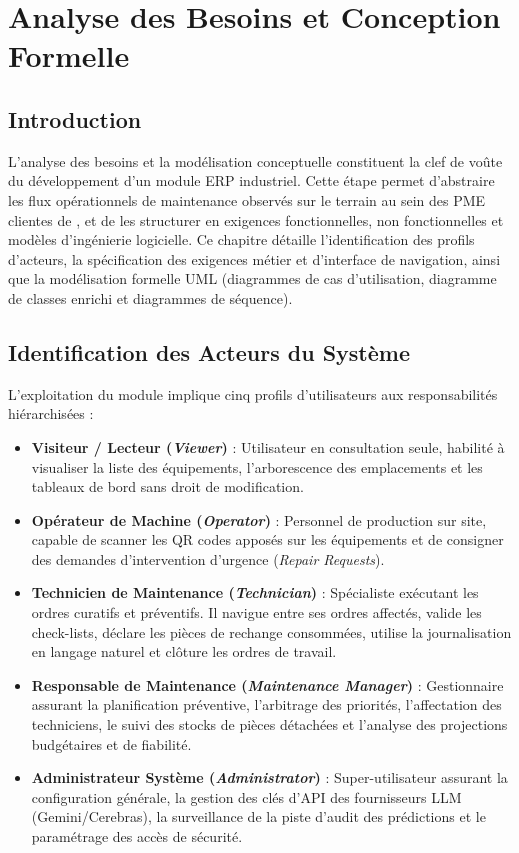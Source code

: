 \chapter{Analyse des Besoins et Conception Formelle}
\label{chap:analysis}

\section{Introduction}
L'analyse des besoins et la modélisation conceptuelle constituent la clef de voûte du développement d'un module ERP industriel. Cette étape permet d'abstraire les flux opérationnels de maintenance observés sur le terrain au sein des PME clientes de \textbf{\companyName}, et de les structurer en exigences fonctionnelles, non fonctionnelles et modèles d'ingénierie logicielle. Ce chapitre détaille l'identification des profils d'acteurs, la spécification des exigences métier et d'interface de navigation, ainsi que la modélisation formelle UML (diagrammes de cas d'utilisation, diagramme de classes enrichi et diagrammes de séquence).

\section{Identification des Acteurs du Système}
L'exploitation du module \textbf{\odooModule} implique cinq profils d'utilisateurs aux responsabilités hiérarchisées :

\begin{itemize}[leftmargin=1.5cm, label=\textcolor{odooPurple}{\small\textbullet}]
    \item \textbf{Visiteur / Lecteur (\textit{Viewer})} : Utilisateur en consultation seule, habilité à visualiser la liste des équipements, l'arborescence des emplacements et les tableaux de bord sans droit de modification.
    \item \textbf{Opérateur de Machine (\textit{Operator})} : Personnel de production sur site, capable de scanner les QR codes apposés sur les équipements et de consigner des demandes d'intervention d'urgence (\textit{Repair Requests}).
    \item \textbf{Technicien de Maintenance (\textit{Technician})} : Spécialiste exécutant les ordres curatifs et préventifs. Il navigue entre ses ordres affectés, valide les check-lists, déclare les pièces de rechange consommées, utilise la journalisation en langage naturel et clôture les ordres de travail.
    \item \textbf{Responsable de Maintenance (\textit{Maintenance Manager})} : Gestionnaire assurant la planification préventive, l'arbitrage des priorités, l'affectation des techniciens, le suivi des stocks de pièces détachées et l'analyse des projections budgétaires et de fiabilité.
    \item \textbf{Administrateur Système (\textit{Administrator})} : Super-utilisateur assurant la configuration générale, la gestion des clés d'API des fournisseurs LLM (Gemini/Cerebras), la surveillance de la piste d'audit des prédictions et le paramétrage des accès de sécurité.
\end{itemize}

